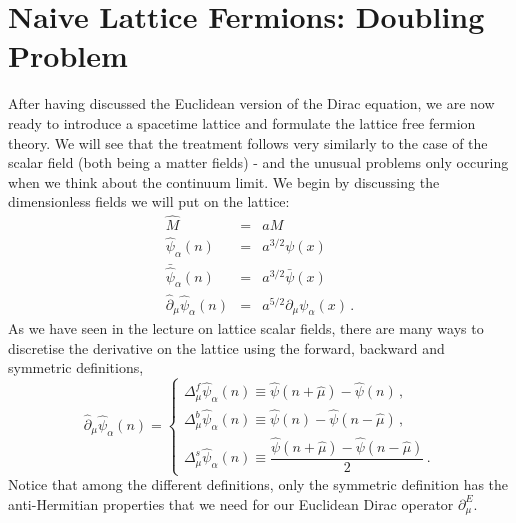 \documentclass[11pt]{article}
\theoremstyle{definition}
\begin{document}
\section{Naive Lattice Fermions: Doubling Problem}
After having discussed the Euclidean version of the Dirac equation, we are now ready to introduce a spacetime lattice and formulate the lattice free fermion theory. We will see that the treatment follows very similarly to the case of the scalar field (both being a matter fields) - and the unusual problems only occuring when we think about the continuum limit.
We begin by discussing the dimensionless fields we will put on the lattice:
\begin{eqnarray}
    \hat{M} &=& a M \\
    \hat{\psi}_{\alpha}(n) &=& a^{3/2} \psi(x) \\
    \bar{\hat{\psi}}_{\alpha}(n) &=& a^{3/2} \bar{\psi}(x) \\
    \hat{\partial}_{\mu}\hat{\psi}_{\alpha}(n) &=& a^{5/2} \partial_{\mu} \psi_{\alpha}(x) \,.
\end{eqnarray} 
As we have seen in the lecture on lattice scalar fields, there are many ways to discretise the derivative on the lattice using the forward, backward and symmetric definitions,
\begin{equation}
    \hat{\partial}_{\mu}\hat{\psi}_{\alpha}(n) =
    \begin{cases}
        \Delta^f_{\mu}\hat{\psi}_{\alpha}(n) \equiv \hat{\psi}(n+\hat{\mu}) - \hat{\psi}(n) \,, \\[10pt]
        \Delta^b_{\mu}\hat{\psi}_{\alpha}(n) \equiv \hat{\psi}(n) - \hat{\psi}(n-\hat{\mu}) \,, \\[10pt]
        \Delta^s_{\mu}\hat{\psi}_{\alpha}(n) \equiv \dfrac{\hat{\psi}(n+\hat{\mu}) - \hat{\psi}(n-\hat{\mu})}{2} \,.
    \end{cases}
\end{equation}
Notice that among the different definitions, only the symmetric definition has the anti-Hermitian properties that we need for our Euclidean Dirac operator $\partial^E_{\mu}$. 
\end{document}
